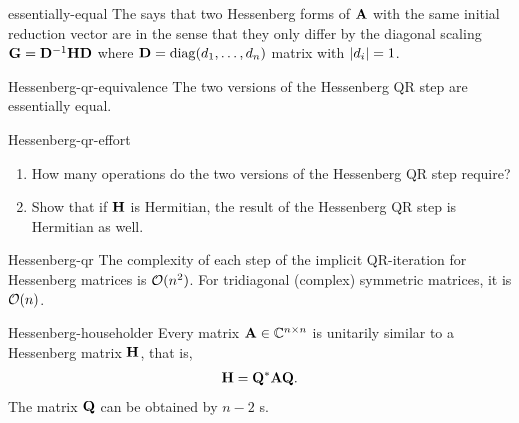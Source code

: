 \begin{Definition}{essentially-equal}
  The  says that two Hessenberg forms of $\mathbf A$ with the same initial reduction vector are  in the sense that they only differ by the diagonal scaling $\mathbf G = \mathbf D^{-1}\mathbf H\mathbf D$ where $\mathbf D=\operatorname{diag}(d_1,\dots,d_n)$ matrix with $\lvert d_{i}\rvert = 1$.
\end{Definition}

\begin{Corollary}{Hessenberg-qr-equivalence}
  The two versions of the Hessenberg QR step are essentially equal.
\end{Corollary}

\begin{Problem}{Hessenberg-qr-effort}
  \begin{enumerate}
  \item How many operations do the two versions of the Hessenberg QR step require?
  \item Show that if $\mathbf H$ is Hermitian, the result of the
    Hessenberg QR step is Hermitian as well.
  \end{enumerate}
\end{Problem}

\begin{Corollary}{Hessenberg-qr}
  The complexity of each step of the implicit QR-iteration for Hessenberg matrices is $\mathcal O(n^2)$. For tridiagonal (complex) symmetric matrices, it is $\mathcal O(n)$.
\end{Corollary}

\begin{Theorem}{Hessenberg-householder}
  Every matrix $\mathbf A\in\mathbb C^{n\times n}$ is unitarily similar to a Hessenberg matrix $\mathbf H$, that is,
  \begin{gather}
    \mathbf H = \mathbf Q^* \mathbf A \mathbf Q.
  \end{gather}
  The matrix $\mathbf Q$ can be obtained by $n-2$ s.
\end{Theorem}

